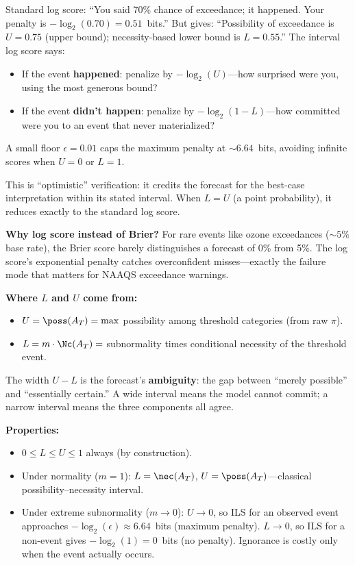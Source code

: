 Standard log score: ``You said 70\% chance of exceedance; it happened. Your penalty is $-\log_2(0.70) = 0.51$~bits.'' But \clyfar{} gives: ``Possibility of exceedance is $U = 0.75$ (upper bound); necessity-based lower bound is $L = 0.55$.'' The interval log score says:

\begin{itemize}[leftmargin=2em]
\item If the event \textbf{happened}: penalize by $-\log_2(U)$---how surprised were you, using the most generous bound?
\item If the event \textbf{didn't happen}: penalize by $-\log_2(1 - L)$---how committed were you to an event that never materialized?
\end{itemize}

A small floor $\epsilon = 0.01$ caps the maximum penalty at ${\sim}6.64$~bits, avoiding infinite scores when $U = 0$ or $L = 1$.

This is ``optimistic'' verification: it credits the forecast for the best-case interpretation within its stated interval. When $L = U$ (a point probability), it reduces exactly to the standard log score.

\textbf{Why log score instead of Brier?} For rare events like ozone exceedances (${\sim}5\%$ base rate), the Brier score barely distinguishes a forecast of 0\% from 5\%. The log score's exponential penalty catches overconfident misses---exactly the failure mode that matters for NAAQS exceedance warnings.

\textbf{Where $L$ and $U$ come from:}
\begin{itemize}[leftmargin=2em]
\item $U = \poss(A_T) = \max$ possibility among threshold categories (from raw $\pi$).
\item $L = m \cdot \Nc(A_T) =$ subnormality times conditional necessity of the threshold event.
\end{itemize}

The width $U - L$ is the forecast's \textbf{ambiguity}: the gap between ``merely possible'' and ``essentially certain.'' A wide interval means the model cannot commit; a narrow interval means the three components all agree.

\textbf{Properties:}
\begin{itemize}[leftmargin=2em]
\item $0 \leq L \leq U \leq 1$ always (by construction).
\item Under normality ($m = 1$): $L = \nec(A_T)$, $U = \poss(A_T)$---classical possibility--necessity interval.
\item Under extreme subnormality ($m \to 0$): $U \to 0$, so ILS for an observed event approaches $-\log_2(\epsilon) \approx 6.64$~bits (maximum penalty). $L \to 0$, so ILS for a non-event gives $-\log_2(1) = 0$~bits (no penalty). Ignorance is costly only when the event actually occurs.
\end{itemize}


